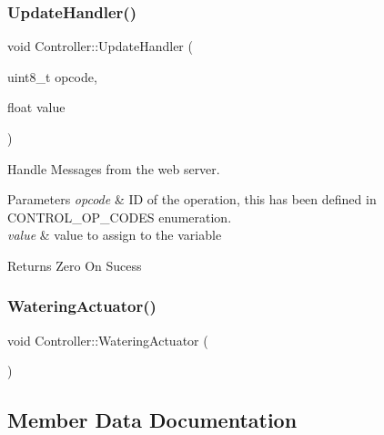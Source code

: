 \mbox{\label{classController_a0a17902e4a70fde975c989c5275e8f05}} 
\subsubsection{\texorpdfstring{Update\+Handler()}{UpdateHandler()}}
{\footnotesize\ttfamily void Controller\+::\+Update\+Handler (\begin{DoxyParamCaption}\item[{uint8\+\_\+t}]{opcode,  }\item[{float}]{value }\end{DoxyParamCaption})}

Handle Messages from the web server.


\begin{DoxyParams}{Parameters}
{\em opcode} & ID of the operation, this has been defined in C\+O\+N\+T\+R\+O\+L\+\_\+\+O\+P\+\_\+\+C\+O\+D\+ES enumeration. \\
\hline
{\em value} & value to assign to the variable\\
\hline
\end{DoxyParams}
\begin{DoxyReturn}{Returns}
Zero On Sucess 
\end{DoxyReturn}
\mbox{\label{classController_a92e03a719890c12f2272b8a6b904d6e1}} 
\subsubsection{\texorpdfstring{Watering\+Actuator()}{WateringActuator()}}
{\footnotesize\ttfamily void Controller\+::\+Watering\+Actuator (\begin{DoxyParamCaption}{ }\end{DoxyParamCaption})\hspace{0.3cm}{\ttfamily [private]}}



\subsection{Member Data Documentation}
\mbox{\label{classController_a5af467109ecf31a0e63213ff9e5d0d72}} 
